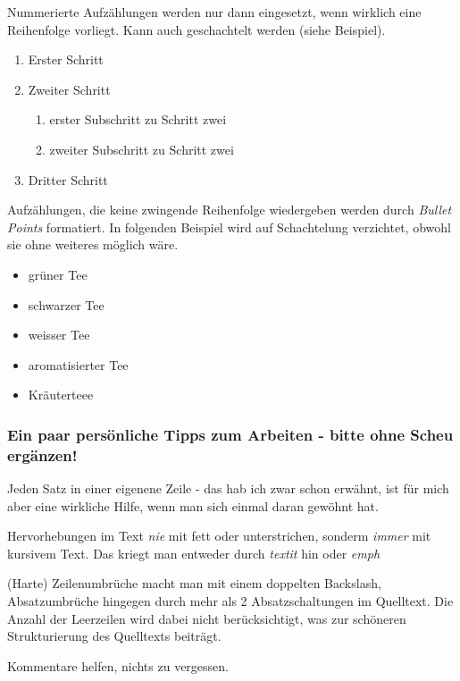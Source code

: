 Nummerierte Aufzählungen werden nur dann eingesetzt, wenn wirklich eine Reihenfolge vorliegt.
Kann auch geschachtelt werden (siehe Beispiel).

\begin{enumerate}
	\item Erster Schritt
	\item Zweiter Schritt
	      \begin{enumerate}
		      \item erster Subschritt zu Schritt zwei
		      \item zweiter Subschritt zu Schritt zwei
	      \end{enumerate}
	\item Dritter Schritt
\end{enumerate}

Aufzählungen, die keine zwingende Reihenfolge wiedergeben werden durch \textit{Bullet Points} formatiert.
In folgenden Beispiel wird auf Schachtelung verzichtet, obwohl sie ohne weiteres möglich wäre.

\begin{itemize}
	\item grüner Tee
	\item schwarzer Tee
	\item weisser Tee
	\item aromatisierter Tee
	\item Kräuterteee
\end{itemize}

\subsubsection{Ein paar persönliche Tipps zum Arbeiten - bitte ohne Scheu ergänzen!}

Jeden Satz in einer eigenene Zeile - das hab ich zwar schon erwähnt, ist für mich aber eine wirkliche Hilfe, wenn man sich einmal daran gewöhnt hat.

Hervorhebungen im Text \textit{nie} mit fett oder unterstrichen, sonderm \textit{immer} mit kursivem Text.
Das kriegt man entweder durch \textit{textit} hin oder \textit{emph}

(Harte) Zeilenumbrüche macht man mit einem doppelten Backslash, Absatzumbrüche hingegen durch mehr als 2 Absatzschaltungen im Quelltext.
Die Anzahl der Leerzeilen wird dabei nicht berücksichtigt, was zur schöneren Strukturierung des Quelltexts beiträgt.

Kommentare helfen, nichts zu vergessen.

